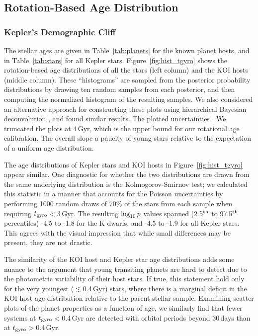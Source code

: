 \documentclass[11pt,twocolumn,tighten]{aastex63}
\begin{document}
\subsection{Rotation-Based Age Distribution}

\subsubsection{Kepler's Demographic Cliff}

The stellar ages are given in Table~\ref{tab:planets} for the known
planet hosts, and in Table~\ref{tab:stars} for all Kepler stars.
Figure~\ref{fig:hist_tgyro} shows the rotation-based age distributions
of all the stars (left column) and the KOI hosts (middle column).
These ``histograms'' are sampled from the posterior probability
distributions by drawing ten random samples from each posterior, and
then computing the normalized histogram of the resulting samples.
We also considered an alternative approach for constructing these
plots using hierarchical Bayesian deconvolution
\citep{Masuda2022infer}, and found similar results.  The plotted
uncertainties .  We truncated the plots
at $4$\,Gyr, which is the upper bound for our
rotational age calibration.  The overall slope  a paucity of
young stars relative to the expectation of a uniform age distribution.

The age distributions of Kepler stars and KOI hosts in
Figure~\ref{fig:hist_tgyro} appear similar.  One diagnostic for
whether the two distributions are drawn from the same underlying
distribution is the Kolmogorov-Smirnov test;  we calculated this
statistic in a manner that accounts for the Poisson uncertainties by
performing 1000 random draws of 70\% of the stars from each sample
when requiring $t_{\rm gyro}$$<$3\,Gyr.  The resulting $\log_{\rm
10}p$ values spanned (2.5$^{\rm th}$ to 97.5$^{\rm th}$ percentiles)
-4.5 to -1.8 for the K dwarfs, and -4.5 to -1.9 for all Kepler stars.
This agrees with the visual impression that while small differences
may be present, they are not drastic.

The similarity of the KOI host and Kepler star age distributions adds
some nuance to the argument that young transiting planets are hard to
detect due to the photometric variability of their host stars.  If
true, this statement  hold only for the very youngest
($\lesssim$0.4\,Gyr) stars, where there is a marginal deficit in the
KOI host age distribution relative to the parent stellar sample.
Examining scatter plots of the planet properties as a function of
age, we similarly find that fewer systems at $t_{\rm
gyro}$$<$0.4\,Gyr are detected with orbital periods beyond 30\,days
than at $t_{\rm gyro}$$>$0.4\,Gyr.
\end{document}
